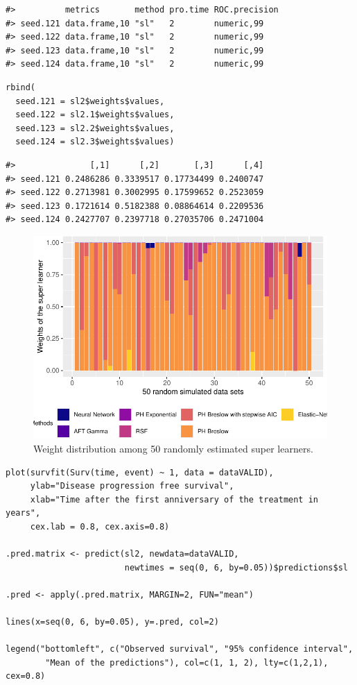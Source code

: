 \begin{verbatim}
#>          metrics       method pro.time ROC.precision
#> seed.121 data.frame,10 "sl"   2        numeric,99   
#> seed.122 data.frame,10 "sl"   2        numeric,99   
#> seed.123 data.frame,10 "sl"   2        numeric,99   
#> seed.124 data.frame,10 "sl"   2        numeric,99
\end{verbatim}

\begin{verbatim}
rbind(
  seed.121 = sl2$weights$values,
  seed.122 = sl2.1$weights$values,
  seed.123 = sl2.2$weights$values,
  seed.124 = sl2.3$weights$values)
\end{verbatim}

\begin{verbatim}
#>               [,1]      [,2]       [,3]      [,4]
#> seed.121 0.2486286 0.3339517 0.17734499 0.2400747
#> seed.122 0.2713981 0.3002995 0.17599652 0.2523059
#> seed.123 0.1721614 0.5182388 0.08864614 0.2209536
#> seed.124 0.2427707 0.2397718 0.27035706 0.2471004
\end{verbatim}

\clearpage

\clearpage

\begin{figure}
\centering
\includegraphics{RJ-2024-037_files/figure-latex/wscea-ggplot-1.pdf}
\caption{\label{fig:wscea-ggplot}Weight distribution among 50 randomly estimated super learners.}
\end{figure}

\clearpage

\begin{verbatim}
plot(survfit(Surv(time, event) ~ 1, data = dataVALID), 
     ylab="Disease progression free survival",
     xlab="Time after the first anniversary of the treatment in years",
     cex.lab = 0.8, cex.axis=0.8)

.pred.matrix <- predict(sl2, newdata=dataVALID,
                        newtimes = seq(0, 6, by=0.05))$predictions$sl

.pred <- apply(.pred.matrix, MARGIN=2, FUN="mean")

lines(x=seq(0, 6, by=0.05), y=.pred, col=2)

legend("bottomleft", c("Observed survival", "95% confidence interval",
        "Mean of the predictions"), col=c(1, 1, 2), lty=c(1,2,1), cex=0.8)
\end{verbatim}


